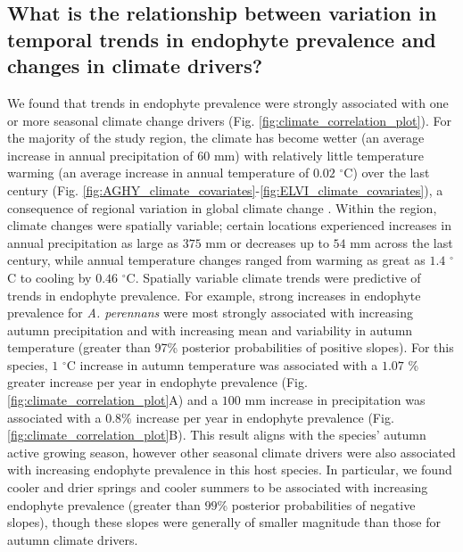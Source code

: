 \documentclass[11pt]{article}
\let\cite\citep
\newcommand{\revise}[1]{{\color{black}{#1}}}
\begin{document}
\subsection*{What is the relationship between variation in temporal trends in endophyte prevalence and changes in climate drivers?}
We found that trends in endophyte prevalence were strongly associated with one or more seasonal climate change drivers (Fig. \ref{fig:climate_correlation_plot}).
For the majority of the study region, the climate has become wetter (an average increase in annual precipitation of $60$ mm) with relatively little temperature warming (an average increase in annual temperature of $0.02$ $^{\circ}$C) over the last century (Fig. \ref{fig:AGHY_climate_covariates}-\ref{fig:ELVI_climate_covariates}), a consequence of regional variation in global climate change \cite{ipcc_2021}. 
Within the region, climate changes were spatially variable; certain locations experienced increases in annual precipitation as large as $375$ mm or decreases up to $54$ mm across the last century, while annual temperature changes ranged from warming as great as $1.4$ $^{\circ}$C to cooling by $0.46$ $^{\circ}$C.
Spatially variable climate trends were predictive of trends in endophyte prevalence.
For example, strong increases in endophyte prevalence for \emph{A. perennans} were most strongly associated with increasing autumn precipitation and with increasing mean and variability in autumn temperature (greater than 97\% posterior probabilities of positive slopes).
For this species, \revise{each} $1$ $^{\circ}$C increase in autumn temperature was associated with a $1.07$ \% greater increase per year in endophyte prevalence (Fig. \ref{fig:climate_correlation_plot}A) and a $100$ mm increase in precipitation was associated with a $0.8$\% \revise{greater} increase per year in endophyte prevalence (Fig. \ref{fig:climate_correlation_plot}B).
This result aligns with the species' autumn active growing season, however other seasonal climate drivers were also associated with increasing endophyte prevalence in this host species. 
In particular, we found cooler and drier springs and cooler summers to be associated with increasing endophyte prevalence (greater than $99$\% posterior probabilities of negative slopes), though these slopes were generally of smaller magnitude than those for autumn climate drivers.
\end{document}
